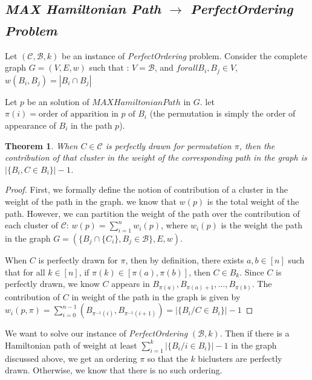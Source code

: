 \documentclass[twoside,leqno,twocolumn]{article}
\newtheorem{theorem}{Theorem}
\theoremstyle{definition}
\begin{document}
\subsection*{\textit{MAX Hamiltonian Path} $\xrightarrow[]{}$ \textit{PerfectOrdering Problem}}

\noindent Let $(\mathcal{C},\mathcal{B},k)$ be an instance of \textit{PerfectOrdering} problem. Consider the complete graph $G = (V, E, w)$ such that :
$V = \mathcal{B}$, and $for all B_i,B_j \in V$, $w(B_i,B_j) = |B_i \cap B_j|$

\bigskip


\noindent Let $p$ be an solution of $MAX Hamiltonian Path$ in $G$. let $\pi(i) = \text{order of apparition in }p\text{ of } B_i$ (the permutation is simply the order of appearance of $B_i$ in the path $p$).

\medskip

\begin{theorem}
When $C \in \mathcal{C}$ is perfectly drawn for permutation $\pi$, then the contribution of that cluster in the weight of the corresponding path in the graph is $|\{B_i, C \in B_i\}|-1$.
\end{theorem}

\begin{proof}

First, we formally define the notion of contribution of a cluster in the weight of the path in the graph. we know that $w(p)$ is the total weight of the path. However, we can partition the weight of the path over the contribution of each cluster of $\mathcal{C}$: $w(p) = \sum_{i=1}^{n}w_{i}(p)$, where $w_i(p)$ is the weight the path in the graph $G=(\{B_j \cap \{C_i\} , B_j \in \mathcal{B}\},E,w).$

\medskip

\noindent When $C$ is perfectly drawn for $\pi$, then by definition, there exists $a,b \in [n]$ such that for all $k \in [n]$, if $\pi(k) \in [\pi(a),\pi(b)]$, then $C \in B_k$. Since $C$ is perfectly drawn, we know $C$ appears in $B_{\pi(a)}, B_{\pi(a)+1},...,B_{\pi(b)}$. The contribution of $C$ in weight of the path in the graph is given by $w_i(p,\pi) = \sum_{i=0}^{n-1}(B_{\pi^{-1}(i)},B_{\pi^{-1}(i+1)}) = |\{B_i / C \in B_i\}|-1$
\end{proof}
 
 \bigskip
 
\noindent We want to solve our instance of \textit{PerfectOrdering} $(\mathcal{B},k)$. Then if there is a Hamiltonian path of weight at least $\sum_{i=1}^{k} |\{B_i / i \in B_i\}|-1$ in the graph discussed above, we get an ordering $\pi$ so that the $k$ biclusters are perfectly drawn. Otherwise, we know that there is no such ordering.
\end{document}
